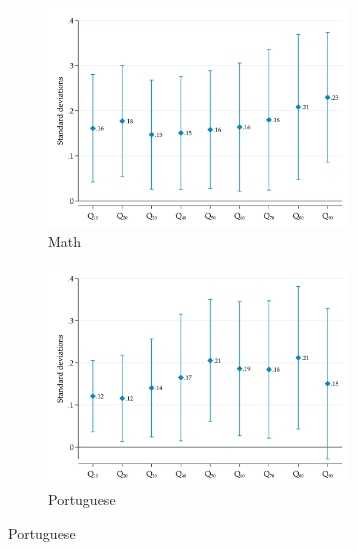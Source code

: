 \documentclass[11pt,a4paper]{article}
\begin{document}
	\clearpage
	\null
	\vfill
	\begin{figure}[ht!]
		\centering
		\caption{Quantile Treatment Effects in 6\textsuperscript{th} Grade -- By Subject}
		\captionsetup[subfigure]{justification=centering}
		\label{fig:qreg_bySubject_grade6}
		
		\begin{subfigure}{0.5\textwidth}
			\centering
			\caption{Math}
			\label{fig:qreg_MT_grade6}
			\includegraphics[width=8cm]{DataWork/Output/Figures/figC1a-qreg_MT_grade6.png}
		\end{subfigure}%
		\begin{subfigure}{0.5\textwidth}
			\centering
			\caption{Portuguese}
			\label{qreg_LT_grade6}
			\includegraphics[width=8cm]{DataWork/Output/Figures/figC1b-qreg_LT_grade6}
		\end{subfigure} 
		
		\vspace{1em}
		

\end{figure}
\end{document}
